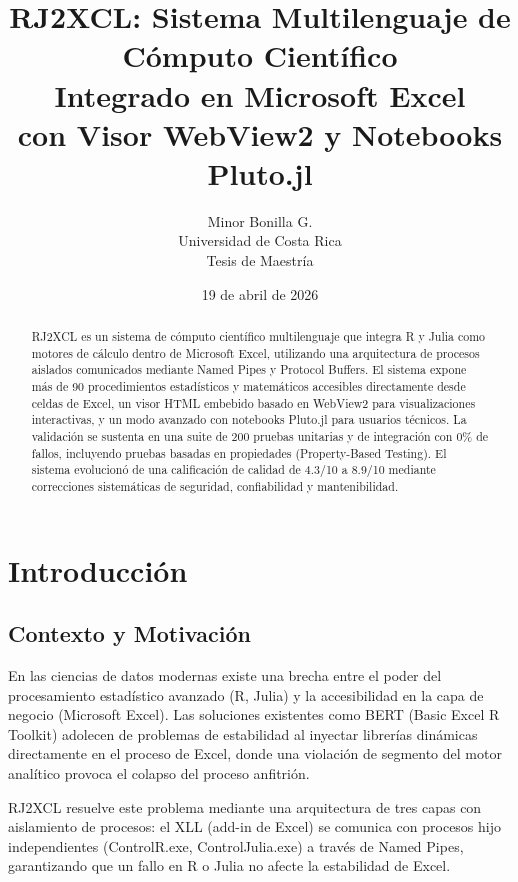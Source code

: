 \documentclass[12pt, a4paper]{report}
\title{\textbf{RJ2XCL: Sistema Multilenguaje de Cómputo Científico\\Integrado en Microsoft Excel\\con Visor WebView2 y Notebooks Pluto.jl}}
\author{Minor Bonilla G.\\Universidad de Costa Rica\\Tesis de Maestría}
\date{19 de abril de 2026}
\begin{document}
\maketitle

\begin{abstract}
RJ2XCL es un sistema de cómputo científico multilenguaje que integra R y Julia como motores de cálculo dentro de Microsoft Excel, utilizando una arquitectura de procesos aislados comunicados mediante Named Pipes y Protocol Buffers. El sistema expone más de 90 procedimientos estadísticos y matemáticos accesibles directamente desde celdas de Excel, un visor HTML embebido basado en WebView2 para visualizaciones interactivas, y un modo avanzado con notebooks Pluto.jl para usuarios técnicos. La validación se sustenta en una suite de 200 pruebas unitarias y de integración con 0\% de fallos, incluyendo pruebas basadas en propiedades (Property-Based Testing). El sistema evolucionó de una calificación de calidad de 4.3/10 a 8.9/10 mediante correcciones sistemáticas de seguridad, confiabilidad y mantenibilidad.
\end{abstract}

\tableofcontents
\newpage

\chapter{Introducción}

\section{Contexto y Motivación}

En las ciencias de datos modernas existe una brecha entre el poder del procesamiento estadístico avanzado (R, Julia) y la accesibilidad en la capa de negocio (Microsoft Excel). Las soluciones existentes como BERT (Basic Excel R Toolkit) adolecen de problemas de estabilidad al inyectar librerías dinámicas directamente en el proceso de Excel, donde una violación de segmento del motor analítico provoca el colapso del proceso anfitrión.

RJ2XCL resuelve este problema mediante una arquitectura de tres capas con aislamiento de procesos: el XLL (add-in de Excel) se comunica con procesos hijo independientes (ControlR.exe, ControlJulia.exe) a través de Named Pipes, garantizando que un fallo en R o Julia no afecte la estabilidad de Excel.
\end{document}
